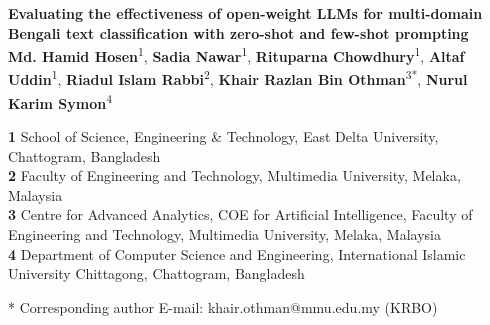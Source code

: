 \documentclass[10pt,letterpaper]{article}
\begin{document}
\vspace*{0.2in}

\begin{flushleft}
{\Large
\textbf{Evaluating the effectiveness of open-weight LLMs for multi-domain Bengali text classification with zero-shot and few-shot prompting}
}
\newline
\\
\textbf{Md. Hamid Hosen}\textsuperscript{1},
\textbf{Sadia Nawar}\textsuperscript{1},
\textbf{Rituparna Chowdhury}\textsuperscript{1},
\textbf{Altaf Uddin}\textsuperscript{1},
\textbf{Riadul Islam Rabbi}\textsuperscript{2},
\textbf{Khair Razlan Bin Othman}\textsuperscript{3*},
\textbf{Nurul Karim Symon}\textsuperscript{4}
\\
\bigskip

\textbf{1} School of Science, Engineering \& Technology, East Delta University, Chattogram, Bangladesh
\\
\textbf{2} Faculty of Engineering and Technology, Multimedia University, Melaka, Malaysia
\\
\textbf{3} Centre for Advanced Analytics, COE for Artificial Intelligence, Faculty of Engineering and Technology, Multimedia University, Melaka, Malaysia
\\
\textbf{4} Department of Computer Science and Engineering, International Islamic University Chittagong, Chattogram, Bangladesh
\\
\bigskip

* Corresponding author
E-mail: khair.othman@mmu.edu.my (KRBO)

\end{flushleft}
\end{document}
